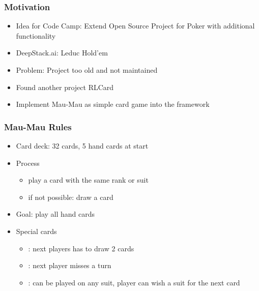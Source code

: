 \begin{frame}
    \frametitle{Motivation}

    \begin{itemize}
        \item Idea for Code Camp: Extend Open Source Project for Poker with additional functionality
        \item DeepStack.ai: Leduc Hold'em
        \item Problem: Project too old and not maintained
        \item Found another project RLCard
        \item Implement Mau-Mau as simple card game into the framework
    \end{itemize}
\end{frame}


\begin{frame}
    \frametitle{Mau-Mau Rules}
    \begin{itemize}
        \item Card deck: 32 cards, 5 hand cards at start
    \item Process
        \begin{itemize}
            \item play a card with the same rank or suit
            \item if not possible: draw a card
        \end{itemize}
    \item Goal: play all hand cards
    \item Special cards
        \begin{itemize}
            \item {} : next players has to draw 2 cards
            \item {} :  next player misses a turn
            \item {} : can be played on any suit, player can wish a suit for the next card
        \end{itemize}
    \end{itemize}
\end{frame}


